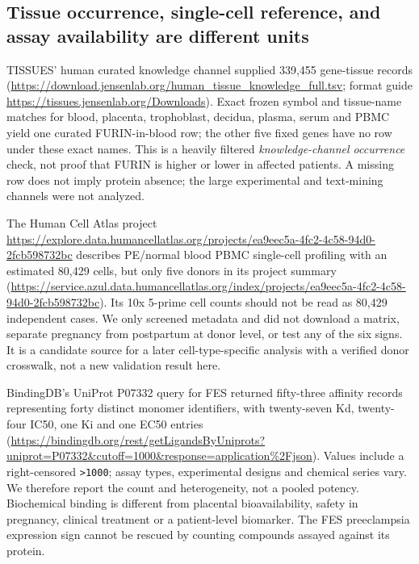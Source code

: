 \documentclass[11pt,a4paper]{article}
\begin{document}
\subsection{Tissue occurrence, single-cell reference, and assay availability are different units}
TISSUES' human curated knowledge channel supplied 339,455 gene-tissue records (\url{https://download.jensenlab.org/human_tissue_knowledge_full.tsv}; format guide \url{https://tissues.jensenlab.org/Downloads}). Exact frozen symbol and tissue-name matches for blood, placenta, trophoblast, decidua, plasma, serum and PBMC yield one curated FURIN-in-blood row; the other five fixed genes have no row under these exact names. This is a heavily filtered \emph{knowledge-channel occurrence} check, not proof that FURIN is higher or lower in affected patients. A missing row does not imply protein absence; the large experimental and text-mining channels were not analyzed.

The Human Cell Atlas project \url{https://explore.data.humancellatlas.org/projects/ea9eec5a-4fc2-4c58-94d0-2fcb598732bc} describes PE/normal blood PBMC single-cell profiling with an estimated 80,429 cells, but only five donors in its project summary (\url{https://service.azul.data.humancellatlas.org/index/projects/ea9eec5a-4fc2-4c58-94d0-2fcb598732bc}). Its 10x 5-prime cell counts should not be read as 80,429 independent cases. We only screened metadata and did not download a matrix, separate pregnancy from postpartum at donor level, or test any of the six signs. It is a candidate source for a later cell-type-specific analysis with a verified donor crosswalk, not a new validation result here.

BindingDB's UniProt P07332 query for FES returned fifty-three affinity records representing forty distinct monomer identifiers, with twenty-seven Kd, twenty-four IC50, one Ki and one EC50 entries (\url{https://bindingdb.org/rest/getLigandsByUniprots?uniprot=P07332&cutoff=1000&response=application%2Fjson}). Values include a right-censored \texttt{>1000}; assay types, experimental designs and chemical series vary. We therefore report the count and heterogeneity, not a pooled potency. Biochemical binding is different from placental bioavailability, safety in pregnancy, clinical treatment or a patient-level biomarker. The FES preeclampsia expression sign cannot be rescued by counting compounds assayed against its protein.
\end{document}
